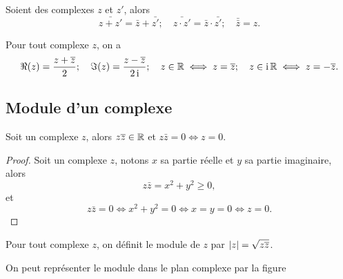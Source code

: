 \begin{prop}
    Soient des complexes \(z\) et \(z'\), alors
    \begin{equation}
        \bar{z+z'}=\bar{z} + \bar{z'}; \quad \bar{z \cdot z'}=\bar{z} \cdot 
        \bar{z'}; \quad \bar{\bar{z}}=z.
    \end{equation}
\end{prop}
\begin{prop}
    Pour tout complexe \(z\), on a
    \begin{equation}
        \Re(z)=\frac{z+\overline{z}}{2}; \quad \Im(z)=\frac{z-\overline{z}}{2 \operatorname{i}}; \quad 
        z \in \mathbb{R} \iff z=\overline{z}; \quad z \in \operatorname{i}\mathbb{R} \iff z=-\overline{z}.
    \end{equation}
\end{prop}
\subsection{Module d'un complexe}
\label{subsec:modulecomplexe}
\begin{prop}
    Soit un complexe \(z\), alors \(z \overline{z} \in \mathbb{R}\) et \(z \bar{z}=0 \iff z = 
    0\).
\end{prop}
\begin{proof}
    Soit un complexe \(z\), notons \(x\) sa partie réelle et \(y\) sa partie 
    imaginaire, alors
    \begin{equation}
        z \bar{z}=x^2+y^2 \geqslant 0,
    \end{equation}
    et
    \begin{equation}
        z \bar{z}=0 \iff x^2+y^2=0 \iff x=y=0 \iff z=0.
    \end{equation}
\end{proof}
\begin{defdef}
    Pour tout complexe \(z\), on définit le module de \(z\) par 
    \(\left\lvert z\right\rvert=\sqrt{z \overline{z}}\).
\end{defdef}
On peut représenter le module dans le plan complexe par la figure 

